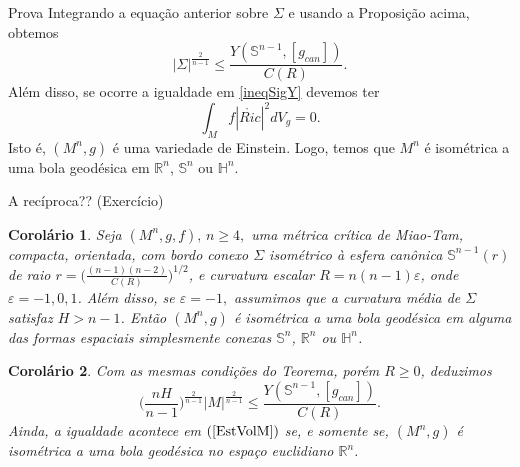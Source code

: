 \documentclass[blue]{beamer}
\newtheorem{cor}{Corolário}
\begin{document}
\begin{frame}{Prova}
Integrando a equação anterior sobre $\Sigma$ e usando a Proposição acima, obtemos
\begin{equation}\label{ineqSigY}
|\Sigma|^{\frac{2}{n-1}} \leq \frac{Y(\mathbb{S}^{n-1}, [g_{can}])}{C(R)}.
\end{equation} \pause
Além disso, se ocorre a igualdade em \eqref{ineqSigY} devemos ter
$$\int_{M} f|\mathring{Ric}|^2 dV_{g}=0.$$ Isto é, $(M^n,g)$ é uma variedade de Einstein.\pause  
Logo, temos que $M^n$ é isométrica a uma bola geodésica em $\mathbb{R}^{n}$, $\mathbb{S}^{n}$ ou $\mathbb{H}^{n}$. \pause

A recíproca?? \pause (Exercício)
\end{frame}



\begin{frame}
\begin{cor}
	Seja $(M^n, g, f), \,n\geq 4,$ uma métrica crítica de Miao-Tam, compacta, orientada, com bordo conexo $\Sigma$ isométrico à esfera canônica $\mathbb{S}^{n-1}(r)$ de raio $r=\Big(\frac{(n-1)(n-2)}{C(R)}\Big)^{1/2}$, e curvatura escalar $R=n(n-1)\varepsilon $, onde $\varepsilon = -1, 0, 1$. Além disso, se $\varepsilon = -1,$ assumimos que a curvatura média de $\Sigma$ satisfaz $H> n-1$. Então $(M^n, g)$ é isométrica a uma bola geodésica em alguma das formas espaciais simplesmente conexas $\mathbb{S}^n$, $\mathbb{R}^{n}$ ou $\mathbb{H}^n$.
\end{cor}\pause
\begin{cor}
	Com as mesmas condições do Teorema, porém $R\ge 0$, deduzimos
	\begin{equation}\label{EstVolM}
	\Big(\frac{nH}{n-1}\Big)^{\frac{2}{n-1}}|M|^{\frac{2}{n-1}}\leq \frac{Y(\mathbb{S}^{n-1}, [g_{can}])}{C(R)}.
	\end{equation}
	Ainda, a igualdade acontece em $(\ref{EstVolM})$ se, e somente se, $(M^n, g)$ é isométrica a uma bola geodésica no espaço euclidiano $\mathbb{R}^{n}$.
\end{cor}
\end{frame}






\end{document}
